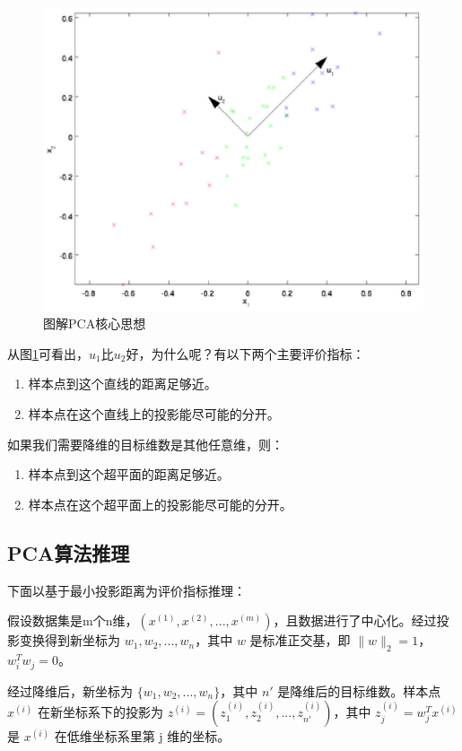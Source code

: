  \begin{figure}[h]
   \centering
   \includegraphics[width=.7\textwidth]{imgs/2.34.1.eps}
   \caption{图解PCA核心思想}
   \label{fig:2.34.1}
 \end{figure}

从图\ref{fig:2.34.1}可看出，$u_1$比$u_2$好，为什么呢？有以下两个主要评价指标：

\begin{enumerate}
\itemsep0em 
\item 样本点到这个直线的距离足够近。
\item 样本点在这个直线上的投影能尽可能的分开。
\end{enumerate}

如果我们需要降维的目标维数是其他任意维，则：

\begin{enumerate}
\itemsep0em 
\item 样本点到这个超平面的距离足够近。
\item 样本点在这个超平面上的投影能尽可能的分开。
\end{enumerate}

\subsection{PCA算法推理}

下面以基于最小投影距离为评价指标推理：

假设数据集是m个n维，$(x^{(1)}, x^{(2)},...,x^{(m)})$，且数据进行了中心化。经过投影变换得到新坐标为 ${w_1,w_2,...,w_n}$，其中 $w$ 是标准正交基，即 $\| w \|_2 = 1$，$w^T_iw_j = 0$。


经过降维后，新坐标为 $\{ w_1,w_2,...,w_n \}$，其中 $n'$ 是降维后的目标维数。样本点 $x^{(i)}$ 在新坐标系下的投影为 $z^{(i)} = \left(z^{(i)}_1, z^{(i)}_2, ..., z^{(i)}_{n'}   \right)$，其中 $z^{(i)}_j = w^T_j x^{(i)}$ 是 $x^{(i)} $ 在低维坐标系里第 j 维的坐标。

